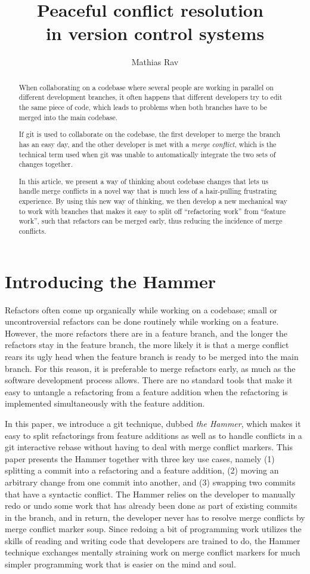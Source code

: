 \documentclass[a4paper]{lipics-v2021}
\title{Peaceful conflict resolution\ \\in version control systems}
\author{Mathias Rav}{Scalgo}{}{}{}
\begin{document}
\maketitle
\begin{abstract}
When collaborating on a codebase where several people are working in parallel on different development branches,
it often happens that different developers try to edit the same piece of code, which leads to problems when both branches have to be merged into the main codebase.

  If git is used to collaborate on the codebase, the first developer to merge the branch has an easy day, and the other developer is met with a \emph{merge conflict},
which is the technical term used when git was unable to automatically integrate the two sets of changes together.

In this article, we present a way of thinking about codebase changes that lets us handle merge conflicts in a novel way that is much less of a hair-pulling frustrating experience.
By using this new way of thinking, we then develop a new mechanical way to work with branches that makes it easy to split off ``refactoring work'' from ``feature work'', such that refactors can be merged early, thus reducing the incidence of merge conflicts.
\end{abstract}
\section{Introducing the Hammer}
Refactors often come up organically while working on a codebase; small or uncontroversial refactors can be done routinely while working on a feature. However, the more refactors there are in a feature branch, and the longer the refactors stay in the feature branch, the more likely it is that a merge conflict rears its ugly head when the feature branch is ready to be merged into the main branch. For this reason, it is preferable to merge refactors early, as much as the software development process allows. There are no standard tools that make it easy to untangle a refactoring from a feature addition when the refactoring is implemented simultaneously with the feature addition.

In this paper, we introduce a git technique, dubbed \emph{the Hammer}, which makes it easy to split refactorings from feature additions as well as to handle conflicts in a git interactive rebase without having to deal with merge conflict markers. This paper presents the Hammer together with three key use cases, namely (1) splitting a commit into a refactoring and a feature addition, (2) moving an arbitrary change from one commit into another, and (3) swapping two commits that have a syntactic conflict. The Hammer relies on the developer to manually redo or undo some work that has already been done as part of existing commits in the branch, and in return, the developer never has to resolve merge conflicts by merge conflict marker soup. Since redoing a bit of programming work utilizes the skills of reading and writing code that developers are trained to do, the Hammer technique exchanges mentally straining work on merge conflict markers for much simpler programming work that is easier on the mind and soul.
\end{document}
